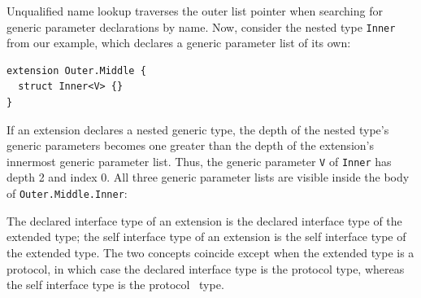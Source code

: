 \documentclass[../generics]{subfiles}
\begin{document}
Unqualified name lookup traverses the outer list pointer when searching for generic parameter declarations by name. Now, consider the nested type \texttt{Inner} from our example, which declares a generic parameter list of its own:
\begin{Verbatim}
extension Outer.Middle {
  struct Inner<V> {}
}
\end{Verbatim}
If an extension declares a nested generic type, the depth of the nested type's generic parameters becomes one greater than the depth of the extension's innermost generic parameter list. Thus, the generic parameter \texttt{V} of \texttt{Inner} has depth 2 and index 0. All three generic parameter lists are visible inside the body of \texttt{Outer.Middle.Inner}:
\begin{quote}
\end{quote}
The declared interface type of an extension is the declared interface type of the extended type; the self interface type of an extension is the self interface type of the extended type. The two concepts coincide except when the extended type is a protocol, in which case the declared interface type is the protocol type, whereas the self interface type is the \IndexSelf protocol \tSelf\ type.
\end{document}
